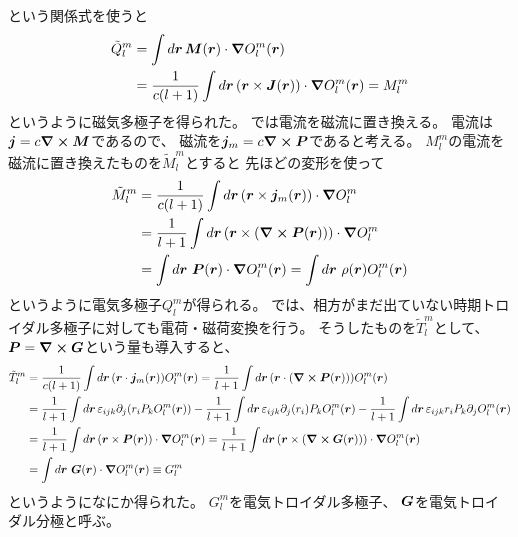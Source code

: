 \documentclass[../../master.tex]{subfiles}
\begin{document}
という関係式を使うと
\begin{align}
    \tilde{Q}_l^m &= \int d\vb*{r}\, \vb*{M}(\vb*{r}) \cdot \grad O_l^m(\vb*{r}) \\
    &=\frac{1}{c(l+1)}\int d\vb*{r}\,(\vb*{r}\times \vb*{J}(\vb*{r}))\cdot \grad O_l^m(\vb*{r}) = M_l^m
\end{align}
というように磁気多極子を得られた。
では電流を磁流に置き換える。
電流は\(\vb*{j}=c\curl \vb*{M}\)であるので、
磁流を\(\vb*{j}_m=c\curl \vb*{P}\)であると考える。
\(M_l^m\)の電流を磁流に置き換えたものを\(\tilde{M}_l^m\)とすると
先ほどの変形を使って
\begin{align}
    \tilde{M}_l^m
    &= \frac{1}{c(l+1)}\int d\vb*{r}\, (\vb*{r}\times \vb*{j}_m(\vb*{r}))\cdot\grad O_l^m\\
    &= \frac{1}{l+1}\int d\vb*{r}\, (\vb*{r}\times (\curl \vb*{P}(\vb*{r}))) \cdot\grad O_l^m\\
    &= \int d\vb*{r}\, \,\vb*{P}(\vb*{r}) \cdot \grad O_l^m(\vb*{r})
    = \int d\vb*{r}\, \,\rho(\vb*{r}) O_l^m(\vb*{r})
\end{align}
というように電気多極子\(Q_l^m\)が得られる。
では、相方がまだ出ていない時期トロイダル多極子に対しても電荷・磁荷変換を行う。
そうしたものを\(\tilde{T}_l^m\)として、
\(\vb*{P} =\curl \vb*{G}\)という量も導入すると、
\begin{align}
    \tilde{T}_l^m
    &= \frac{1}{c(l+1)} \int d\vb*{r}\, (\vb*{r}\cdot \vb*{j}_m(\vb*{r}))O_l^m(\vb*{r})
    = \frac{1}{l+1} \int d\vb*{r}\, (\vb*{r}\cdot (\curl \vb*{P}(\vb*{r})))O_l^m(\vb*{r})\\
    &= \frac{1}{l+1} \int d\vb*{r}\, \varepsilon_{ijk} \partial_j(r_i P_k O_l^m(\vb*{r}))
    - \frac{1}{l+1} \int d\vb*{r}\, \varepsilon_{ijk} \partial_j(r_i) P_k O_l^m(\vb*{r})
    - \frac{1}{l+1} \int d\vb*{r}\, \varepsilon_{ijk} r_i P_k \partial_jO_l^m(\vb*{r})\\
    &= \frac{1}{l+1} \int d\vb*{r}\, (\vb*{r}\times \vb*{P}(\vb*{r})) \cdot \grad O_l^m(\vb*{r})
    = \frac{1}{l+1} \int d\vb*{r}\, (\vb*{r}\times (\curl \vb*{G}(\vb*{r}))) \cdot \grad O_l^m(\vb*{r})\\
    &= \int d\vb*{r}\, \,\vb*{G}(\vb*{r}) \cdot \grad O_l^m(\vb*{r})
    \equiv G_l^m
\end{align}
というようになにか得られた。
\(G_l^m\)を電気トロイダル多極子、
\(\vb*{G}\)を電気トロイダル分極と呼ぶ。
\end{document}
